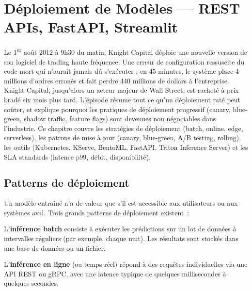 \chapter{D\'eploiement de Mod\`eles --- REST APIs, FastAPI, Streamlit}
\label{ch:deploiement}

Le 1\textsuperscript{er} août 2012 à 9h30 du matin, Knight Capital déploie une nouvelle version de son logiciel de trading haute fréquence. Une erreur de configuration ressuscite du code mort qui n'aurait jamais dû s'exécuter ; en 45 minutes, le système place 4 millions d'ordres erronés et fait perdre 440 millions de dollars à l'entreprise. Knight Capital, jusqu'alors un acteur majeur de Wall Street, est racheté à prix bradé six mois plus tard. L'épisode résume tout ce qu'un déploiement raté peut coûter, et explique pourquoi les pratiques de déploiement progressif (canary, blue-green, shadow traffic, feature flags) sont devenues non négociables dans l'industrie. Ce chapitre couvre les stratégies de déploiement (batch, online, edge, serverless), les patrons de mise à jour (canary, blue-green, A/B testing, rolling), les outils (Kubernetes, KServe, BentoML, FastAPI, Triton Inference Server) et les SLA standards (latence p99, débit, disponibilité).

\section{Patterns de d\'eploiement}
\label{sec:deployment-patterns}

Un mod\`ele entra\^in\'e n'a de valeur que s'il est accessible aux
utilisateurs ou aux syst\`emes aval. Trois grands patterns de d\'eploiement
existent~:

\begin{definition}
L'\textbf{inf\'erence batch} consiste \`a ex\'ecuter
les pr\'edictions sur un lot de donn\'ees \`a intervalles r\'eguliers
(par exemple, chaque nuit). Les r\'esultats sont stock\'es dans une base
de donn\'ees ou un fichier.
\end{definition}

\begin{definition}
L'\textbf{inf\'erence en ligne} (ou temps r\'eel)
r\'epond \`a des requ\^etes individuelles via une API REST ou gRPC, avec
une latence typique de quelques millisecondes \`a quelques secondes.
\end{definition}

